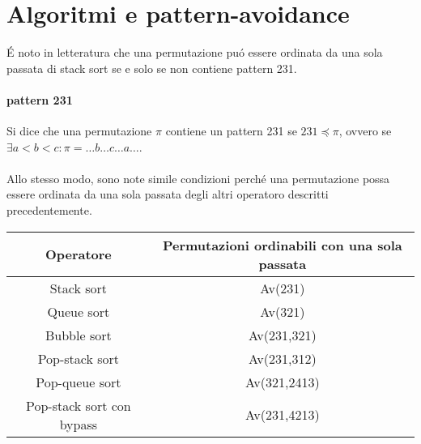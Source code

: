 \section*{Algoritmi e pattern-avoidance}
\'E noto in letteratura \cite{limbrief} che una permutazione pu\'o essere ordinata da una sola passata di stack sort se e solo se non contiene pattern 231.
\paragraph*{pattern 231}Si dice che una permutazione $\pi$ contiene un pattern 231 se $231\preceq\pi$, ovvero se $\exists a<b<c: \pi =\dots{b}\dots{c}\dots{a}\dots$.\\\\
Allo stesso modo, sono note simile condizioni perch\'e una permutazione possa essere ordinata da una sola passata degli altri operatoro descritti precedentemente.
\begin{center}
\begin{tabular}{ |c|c| } 
\hline
\textbf{Operatore} & \textbf{Permutazioni ordinabili con una sola passata} \\ 
\hline
Stack sort & Av(231)\\ 
Queue sort & Av(321)\\ 
Bubble sort & Av(231,321)\\ 
Pop-stack sort & Av(231,312)\\ 
Pop-queue sort& Av(321,2413)\\ 
Pop-stack sort con bypass &Av(231,4213)\\ 
\hline
\end{tabular}
\end{center}
